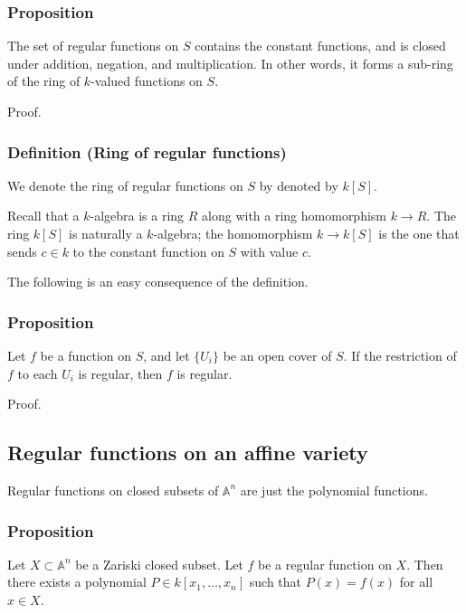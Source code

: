 \documentclass[11pt]{article}
\begin{document}
\subsubsection{Proposition}
\label{sec:org2732576}
The set of regular functions on \(S\) contains the constant functions, and is closed under addition, negation, and multiplication.
In other words, it forms a sub-ring of the ring of \(k\)-valued functions on \(S\).

\begin{skipped}
Proof.
\end{skipped}

\subsubsection{Definition (Ring of regular functions)}
\label{sec:org92dfe46}
We denote the ring of regular functions on \(S\) by denoted by \(k[S]\).


Recall that a \(k\)-algebra is a ring \(R\) along with a ring homomorphism \(k \to R\).
The ring \(k[S]\) is naturally a \(k\)-algebra; the homomorphism \(k \to k[S]\) is the one that sends \(c \in k\) to the constant function on \(S\) with value \(c\).

The following is an easy consequence of the definition.
\subsubsection{Proposition}
\label{sec:org961170e}
Let \(f\) be a function on \(S\), and let \(\{U_i\}\) be an open cover of \(S\).
If the restriction of \(f\) to each \(U_i\) is regular, then \(f\) is regular.

\begin{skipped}
Proof.
\end{skipped}

\subsection{Regular functions on an affine variety}
\label{sec:org60f481b}
Regular functions on closed subsets of \(\mathbb A^n\) are just the polynomial functions.
\subsubsection{Proposition}
\label{sec:orgc6fae60}
Let \(X \subset \mathbb A^n\) be a Zariski closed subset.
Let \(f\) be a regular function on \(X\).
Then there exists a polynomial \(P \in k[x_1,\dots,x_n]\) such that \(P(x) = f(x)\) for all \(x \in X\).
\end{document}

